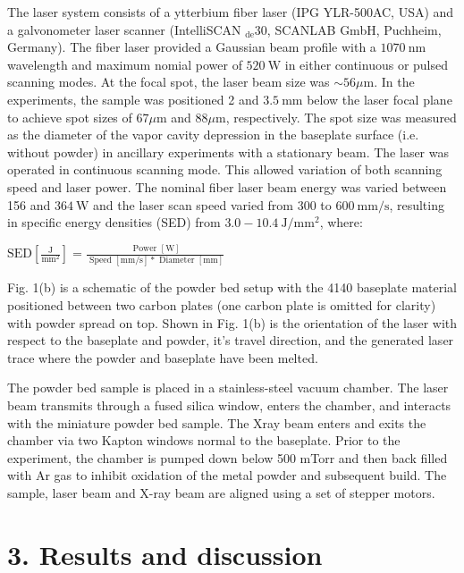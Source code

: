 \documentclass[10pt]{article}
\begin{document}
The laser system consists of a ytterbium fiber laser (IPG YLR-500AC, USA) and a galvonometer laser scanner (IntelliSCAN ${ }_{\mathrm{de}} 30$, SCANLAB GmbH, Puchheim, Germany). The fiber laser provided a Gaussian beam profile with a $1070 \mathrm{~nm}$ wavelength and maximum nomial power of $520 \mathrm{~W}$ in either continuous or pulsed scanning modes. At the focal spot, the laser beam size was $\sim 56 \mu \mathrm{m}$. In the experiments, the sample was positioned 2 and $3.5 \mathrm{~mm}$ below the laser focal plane to achieve spot sizes of $67 \mu \mathrm{m}$ and $88 \mu \mathrm{m}$, respectively. The spot size was measured as the diameter of the vapor cavity depression in the baseplate surface (i.e. without powder) in ancillary experiments with a stationary beam. The laser was operated in continuous scanning mode. This allowed variation of both scanning speed and laser power. The nominal fiber laser beam energy was varied between 156 and $364 \mathrm{~W}$ and the laser scan speed varied from 300 to $600 \mathrm{~mm} / \mathrm{s}$, resulting in specific energy densities (SED) from $3.0-10.4 \mathrm{~J} / \mathrm{mm}^{2}$, where:

$\mathrm{SED}\left[\frac{\mathrm{J}}{\mathrm{mm}^{2}}\right]=\frac{\text { Power }[\mathrm{W}]}{\text { Speed }[\mathrm{mm} / \mathrm{s}] * \text { Diameter }[\mathrm{mm}]}$

Fig. 1(b) is a schematic of the powder bed setup with the 4140 baseplate material positioned between two carbon plates (one carbon plate is omitted for clarity) with powder spread on top. Shown in Fig. 1(b) is the orientation of the laser with respect to the baseplate and powder, it's travel direction, and the generated laser trace where the powder and baseplate have been melted.

The powder bed sample is placed in a stainless-steel vacuum chamber. The laser beam transmits through a fused silica window, enters the chamber, and interacts with the miniature powder bed sample. The Xray beam enters and exits the chamber via two Kapton windows normal to the baseplate. Prior to the experiment, the chamber is pumped down below 500 mTorr and then back filled with Ar gas to inhibit oxidation of the metal powder and subsequent build. The sample, laser beam and $\mathrm{X}$-ray beam are aligned using a set of stepper motors.

\section*{3. Results and discussion}
\end{document}
